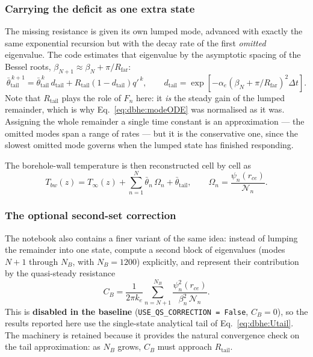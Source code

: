 \documentclass[11pt]{article}
\begin{document}
\subsubsection{Carrying the deficit as one extra state}
The missing resistance is given its own lumped mode, advanced with exactly the
same exponential recursion but with the decay rate of the first \emph{omitted}
eigenvalue. The code estimates that eigenvalue by the asymptotic spacing of the
Bessel roots, $\beta_{N+1}\approx\beta_N+\pi/R_{\mathrm{far}}$:
\begin{equation}
\bar\theta_{\mathrm{tail}}^{\,k+1} =\bar\theta_{\mathrm{tail}}^{\,k}\,d_{\mathrm{tail}}
+R_{\mathrm{tail}}\left(1-d_{\mathrm{tail}}\right)q'^{\,k}, \qquad
d_{\mathrm{tail}}=\exp\!\left[-\alpha_e\left(\beta_N+\pi/R_{\mathrm{far}}\right)^{2}\Delta
t\right].
\label{eq:dbhe:Utail}
\end{equation}
Note that $R_{\mathrm{tail}}$ plays the role of $F_n$ here: it \emph{is} the
steady gain of the lumped remainder, which is why Eq.~\eqref{eq:dbhe:modeODE}
was normalised as it was. Assigning the whole remainder a single time constant
is an approximation --- the omitted modes span a range of rates --- but it is the
conservative one, since the slowest omitted mode governs when the lumped state
has finished responding.

The borehole-wall temperature is then reconstructed cell by cell as
\begin{equation}
T_{bw}(z)=T_\infty(z)+\sum_{n=1}^{N}\bar\theta_n\,\Omega_n +\bar\theta_{\mathrm{tail}},
\qquad \Omega_n=\frac{\psi_n(r_{ce})}{\mathcal{N}_n} .
\label{eq:dbhe:Tbw}
\end{equation}

\subsubsection{The optional second-set correction}
The notebook also contains a finer variant of the same idea: instead of lumping
the remainder into one state, compute a second block of eigenvalues (modes
$N+1$ through $N_B$, with $N_B=1200$) explicitly, and represent their
contribution by the quasi-steady resistance
\begin{equation}
C_B=\frac{1}{2\pi k_e}\sum_{n=N+1}^{N_B}
\frac{\psi_n^{2}(r_{ce})}{\beta_n^{2}\,\mathcal{N}_n} .
\label{eq:dbhe:CB}
\end{equation}
This is \textbf{disabled in the baseline} (\texttt{USE\_QS\_CORRECTION = False},
$C_B=0$), so the results reported here use the single-state analytical tail of
Eq.~\eqref{eq:dbhe:Utail}. The machinery is retained because it provides the
natural convergence check on the tail approximation: as $N_B$ grows, $C_B$ must
approach $R_{\mathrm{tail}}$.
\end{document}
